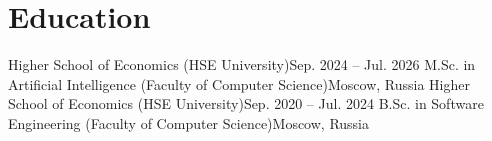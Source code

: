 \section{Education}
  \resumeSubHeadingListStart
    \resumeSubheading
      {Higher School of Economics (HSE University)}{Sep. 2024 -- Jul. 2026}
      {M.Sc. in Artificial Intelligence (Faculty of Computer Science)}{Moscow, Russia}
    \resumeSubheading
      {Higher School of Economics (HSE University)}{Sep. 2020 -- Jul. 2024}
      {B.Sc. in Software Engineering (Faculty of Computer Science)}{Moscow, Russia}
      \resumeItemListStart
      \resumeItemListEnd
  \resumeSubHeadingListEnd